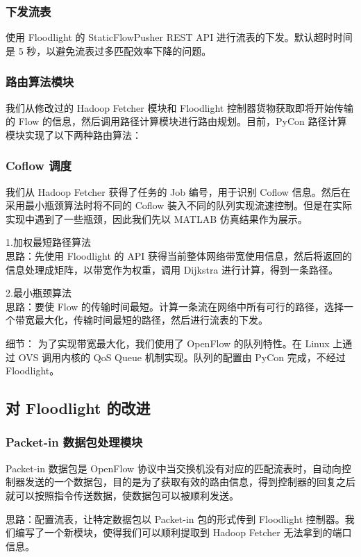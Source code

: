 \documentclass[a4paper, 11pt]{article}                                                   %
\begin{document}
\begin{CJK*}{UTF8}{song}
\subsubsection{下发流表}
使用 Floodlight 的 StaticFlowPusher REST API 进行流表的下发。默认超时时间是 5 秒，以避免流表过多匹配效率下降的问题。

\subsubsection{路由算法模块}
我们从修改过的 Hadoop Fetcher 模块和 Floodlight 控制器货物获取即将开始传输的 Flow 的信息，然后调用路径计算模块进行路由规划。目前，PyCon 路径计算模块实现了以下两种路由算法：

\subsubsection{Coflow 调度}
我们从 Hadoop Fetcher 获得了任务的 Job 编号，用于识别 Coflow 信息。然后在采用最小瓶颈算法时将不同的 Coflow 装入不同的队列实现流速控制。但是在实际实现中遇到了一些瓶颈，因此我们先以 MATLAB 仿真结果作为展示。

1.加权最短路径算法\\
思路：先使用 Floodlight 的 API 获得当前整体网络带宽使用信息，然后将返回的信息处理成矩阵，以带宽作为权重，调用 Dijkstra 进行计算，得到一条路径。
\bigskip

2.最小瓶颈算法\\
思路：要使 Flow 的传输时间最短。计算一条流在网络中所有可行的路径，选择一个带宽最大化，传输时间最短的路径，然后进行流表的下发。

细节：
为了实现带宽最大化，我们使用了 OpenFlow 的队列特性。在 Linux 上通过 OVS 调用内核的 QoS Queue 机制实现。队列的配置由 PyCon 完成，不经过 Floodlight。
\subsection{对 Floodlight 的改进}
\subsubsection{Packet-in 数据包处理模块}
Packet-in 数据包是 OpenFlow 协议中当交换机没有对应的匹配流表时，自动向控制器发送的一个数据包，目的是为了获取有效的路由信息，得到控制器的回复之后就可以按照指令传送数据，使数据包可以被顺利发送。

思路：配置流表，让特定数据包以 Packet-in 包的形式传到 Floodlight 控制器。我们编写了一个新模块，使得我们可以顺利提取到 Hadoop Fetcher 无法拿到的端口信息。


\end{CJK*}
\end{document}
